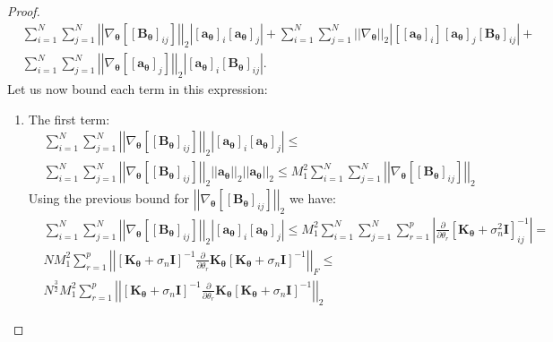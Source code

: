 \documentclass[jair,twoside,11pt,theapa]{article}
\theoremstyle{definition}
\begin{document}
\begin{proof}
\begin{align*}
    &\sum_{i=1}^N\sum_{j=1}^N\left|\left|\nabla_{\bm{\theta}}\left[\left[\bm{B}_{\bm{\theta}}\right]_{ij}\right]\right|\right|_2\left|[\bm{a}_{\bm{\theta}}]_i[\bm{a}_{\bm{\theta}}]_j\right| + \nonumber
    \sum_{i=1}^N\sum_{j=1}^N\left|\left|\nabla_{\bm{\theta}}\right|\right|_2\left|\left[[\bm{a}_{\bm{\theta}}]_i\right][\bm{a}_{\bm{\theta}}]_j\left[\bm{B}_{\bm{\theta}}\right]_{ij}\right| + \\\nonumber
    &\sum_{i=1}^N\sum_{j=1}^N\left|\left|\nabla_{\bm{\theta}}\left[[\bm{a}_{\bm{\theta}}]_j\right]\right|\right|_2\left|[\bm{a}_{\bm{\theta}}]_i\left[\bm{B}_{\bm{\theta}}\right]_{ij}\right|.
\end{align*}
Let us now bound each term in this expression:
\begin{enumerate}
    \item The first term:
    \begin{align*}
        &\sum_{i=1}^N\sum_{j=1}^N\left|\left|\nabla_{\bm{\theta}}\left[\left[\bm{B}_{\bm{\theta}}\right]_{ij}\right]\right|\right|_2\left|[\bm{a}_{\bm{\theta}}]_i[\bm{a}_{\bm{\theta}}]_j\right| \le \\\nonumber
        &\sum_{i=1}^N\sum_{j=1}^N\left|\left|\nabla_{\bm{\theta}}\left[\left[\bm{B}_{\bm{\theta}}\right]_{ij}\right]\right|\right|_2\left|\left|\bm{a}_{\bm{\theta}}\right|\right|_2\left|\left|\bm{a}_{\bm{\theta}}\right|\right|_2\le\nonumber
        M^2_1\sum_{i=1}^N\sum_{j=1}^N\left|\left|\nabla_{\bm{\theta}}\left[\left[\bm{B}_{\bm{\theta}}\right]_{ij}\right]\right|\right|_2
    \end{align*}
    Using the previous bound for $\left|\left|\nabla_{\bm{\theta}}\left[\left[\bm{B}_{\bm{\theta}}\right]_{ij}\right]\right|\right|_2$ we have:
    \begin{align*}
        &\sum_{i=1}^N\sum_{j=1}^N\left|\left|\nabla_{\bm{\theta}}\left[\left[\bm{B}_{\bm{\theta}}\right]_{ij}\right]\right|\right|_2\left|[\bm{a}_{\bm{\theta}}]_i[\bm{a}_{\bm{\theta}}]_j\right| \le\nonumber
        M^2_1\sum_{i=1}^N\sum_{j=1}^N\sum_{r=1}^p\left|\frac{\partial}{\partial\theta_r}\left[\bm{K}_{\bm{\theta}} + \sigma^{2}_{n} \textbf{I}\right]^{-1}_{ij}\right| = \\\nonumber
        &NM^2_1\sum_{r=1}^p\left|\left|\left[\bm{K}_{\bm{\theta}} + \sigma_{n}\bm{I}\right]^{-1}\frac{\partial}{\partial\theta_r}\bm{K}_{\bm{\theta}}\left[\bm{K}_{\bm{\theta}} + \sigma_{n}\bm{I}\right]^{-1}\right|\right|_F \le\\\nonumber
        &N^{\frac{3}{2}}M^2_1\sum_{r=1}^p\left|\left|\left[\bm{K}_{\bm{\theta}} + \sigma_{n}\bm{I}\right]^{-1}\frac{\partial}{\partial\theta_r}\bm{K}_{\boldsymbol{\theta}}\left[\bm{K}_{\bm{\theta}} + \sigma_{n}\bm{I}\right]^{-1}\right|\right|_2

\end{align*}
\end{enumerate}
\end{proof}
\end{document}

